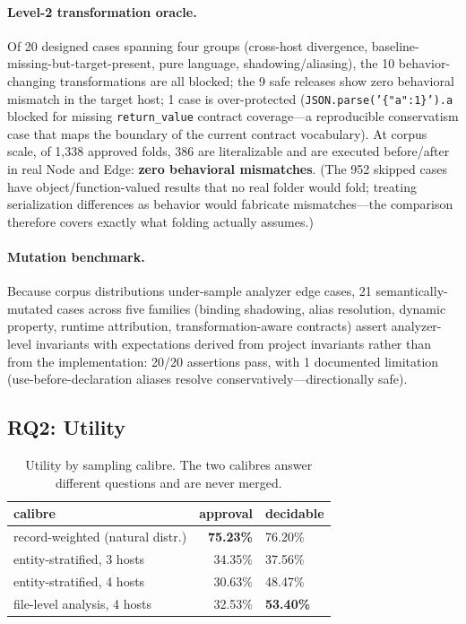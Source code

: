\documentclass[sigconf,nonacm]{acmart}
\begin{document}
\paragraph{Level-2 transformation oracle.} Of 20 designed cases spanning four groups (cross-host divergence, baseline-missing-but-target-present, pure language, shadowing/aliasing), the 10 behavior-changing transformations are all blocked; the 9 safe releases show zero behavioral mismatch in the target host; 1 case is over-protected (\texttt{JSON.parse('\{"a":1\}').a} blocked for missing \texttt{return\_value} contract coverage---a reproducible conservatism case that maps the boundary of the current contract vocabulary). At corpus scale, of 1{,}338 approved folds, 386 are literalizable and are executed before/after in real Node and Edge: \textbf{zero behavioral mismatches}. (The 952 skipped cases have object/function-valued results that no real folder would fold; treating serialization differences as behavior would fabricate mismatches---the comparison therefore covers exactly what folding actually assumes.)

\paragraph{Mutation benchmark.} Because corpus distributions under-sample analyzer edge cases, 21 semantically-mutated cases across five families (binding shadowing, alias resolution, dynamic property, runtime attribution, transformation-aware contracts) assert analyzer-level invariants with expectations derived from project invariants rather than from the implementation: 20/20 assertions pass, with 1 documented limitation (use-before-declaration aliases resolve conservatively---directionally safe).

\subsection{RQ2: Utility}\label{sec:rq2}

\begin{table}[t]
  \centering
  \caption{Utility by sampling calibre. The two calibres answer different questions and are never merged.}
  \label{tab:utility}
  \small
  \begin{tabular}{lrl}
    \toprule
    calibre & approval & decidable \\
    \midrule
    record-weighted (natural distr.) & \textbf{75.23\%} & 76.20\% \\
    entity-stratified, 3 hosts & 34.35\% & 37.56\% \\
    entity-stratified, 4 hosts & 30.63\% & 48.47\% \\
    file-level analysis, 4 hosts & 32.53\% & \textbf{53.40\%} \\
    \bottomrule
  \end{tabular}
\end{table}
\end{document}
